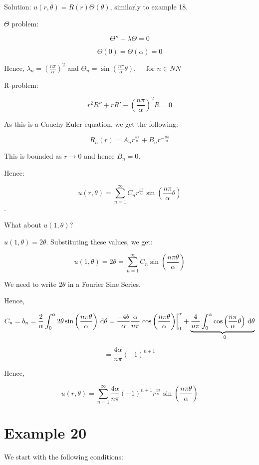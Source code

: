 \documentclass{article}
\begin{document}
Solution: $u(r, \theta) = R(r) \Theta (\theta)$, similarly to example 18. 

$\Theta$ problem:

$$\Theta'' + \lambda \Theta = 0$$

$$\Theta(0) = \Theta(\alpha) = 0$$

Hence, $\lambda_n = \left( \frac{n \pi}{\alpha} \right)^2$ and $\Theta_n = \sin \left( \frac{n \pi}{\alpha} \theta \right), \quad \text{ for }n \in NN$

R-problem: 

$$r^2 R'' + r R' - ( \frac{n \pi}{\alpha})^2 R = 0$$

As this is a Cauchy-Euler equation, we get the following:

$$R_n(r) = A_n r^{\frac{n \pi}{\alpha}} + B_n r^{- \frac{n \pi}{\alpha}}$$

This is bounded as $r \to 0$ and hence $B_n = 0$. 

Hence:

$$u(r, \theta) = \sum_{n=1}^\infty C_n r^{\frac{n \pi}{\alpha}} \sin \left( \frac{n \pi}{\alpha} \theta \right)$$. 

What about $u(1, \theta)$?

$u(1, \theta) = 2 \theta$. Substituting these values, we get:

$$u(1, \theta) = 2 \theta = \sum_{n=1}^\infty C_n \sin \left( \frac{n \pi \theta}{\alpha} \right)$$

We need to write $2 \theta$ in a Fourier Sine Series. 

Hence, 

$$C_n = b_n = \frac{2}{\alpha} \int_0^\alpha 2 \theta \sin \left( \frac{n \pi \theta}{\alpha} \right) \,\mathrm{d} \theta = \frac{-4 \theta}{\alpha} \frac{\alpha}{n \pi}  \left. \cos \left( \frac{n \pi \theta}{\alpha} \right) \right|_0^\alpha + \underbrace{ \frac{4}{n \pi} \int_0^\alpha \cos \left( \frac{n \pi }{\alpha} \theta \right) \,\mathrm{d} \theta}_{ = 0}$$

$$ = \frac{4 \alpha}{n \pi} (-1)^{n+1}$$

Hence, 

$$u(r, \theta) = \sum_{n=1}^\infty \frac{4 \alpha}{n \pi} (-1)^{n+1} r^{\frac{n \pi}{\alpha}} \sin \left( \frac{n \pi \theta}{\alpha} \right)$$

\section{Example 20}

We start with the following conditions:
\end{document}
